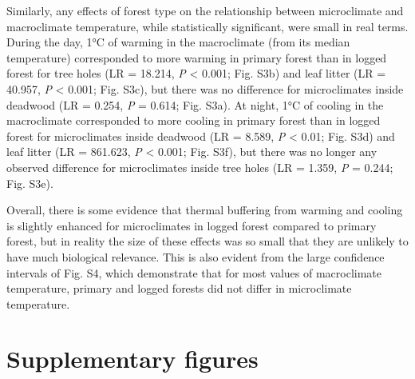 \documentclass[12pt,a4paper,]{report}
\theoremstyle{definition}
\theoremstyle{definition}
\theoremstyle{definition}
\theoremstyle{remark}
\begin{document}
Similarly, any effects of forest type on the relationship between
microclimate and macroclimate temperature, while statistically
significant, were small in real terms. During the day, 1°C of warming in
the macroclimate (from its median temperature) corresponded to more
warming in primary forest than in logged forest for tree holes (LR =
18.214, \emph{P} \textless{} 0.001; Fig. S3b) and leaf litter (LR =
40.957, \emph{P} \textless{} 0.001; Fig. S3c), but there was no
difference for microclimates inside deadwood (LR = 0.254, \emph{P} =
0.614; Fig. S3a). At night, 1°C of cooling in the macroclimate
corresponded to more cooling in primary forest than in logged forest for
microclimates inside deadwood (LR = 8.589, \emph{P} \textless{} 0.01;
Fig. S3d) and leaf litter (LR = 861.623, \emph{P} \textless{} 0.001;
Fig. S3f), but there was no longer any observed difference for
microclimates inside tree holes (LR = 1.359, \emph{P} = 0.244; Fig.
S3e).

Overall, there is some evidence that thermal buffering from warming and
cooling is slightly enhanced for microclimates in logged forest compared
to primary forest, but in reality the size of these effects was so small
that they are unlikely to have much biological relevance. This is also
evident from the large confidence intervals of Fig. S4, which
demonstrate that for most values of macroclimate temperature, primary
and logged forests did not differ in microclimate temperature.

\pagebreak

\section{Supplementary figures}\label{supplementary-figures-1}
\end{document}
